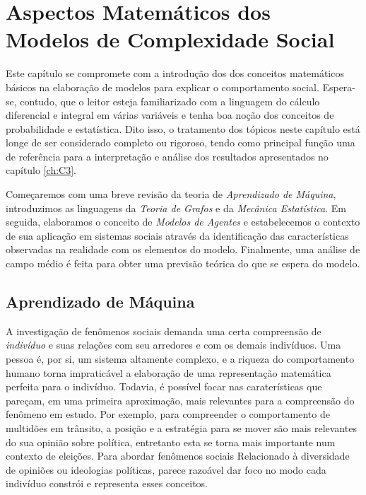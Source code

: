 

\chapter{Aspectos Matemáticos dos\\Modelos de Complexidade Social}
\label{ch:C2}

Este capítulo se compromete com a introdução dos dos conceitos
matemáticos básicos na elaboração de modelos para explicar o
comportamento social.  Espera-se, contudo, que o leitor esteja
familiarizado com a linguagem do cálculo diferencial e integral em
várias variáveis e tenha boa noção dos conceitos de probabilidade e
estatística.  Dito isso, o tratamento dos tópicos neste capítulo está
longe de ser considerado completo ou rigoroso, tendo como principal
função uma de referência para a interpretação e análise dos resultados
apresentados no capítulo \ref{ch:C3}.

Começaremos com uma breve revisão da teoria de \emph{Aprendizado de Máquina},
introduzimos as linguagens da \emph{Teoria de Grafos} e da \emph{Mecânica
Estatística}.  Em seguida, elaboramos o conceito de \emph{Modelos de Agentes}
e estabelecemos o contexto de sua aplicação em sistemas sociais através da
identificação das características observadas na realidade com os elementos do
modelo.  Finalmente, uma análise de campo médio é feita para obter uma previsão
teórica do que se espera do modelo.

\section{Aprendizado de Máquina}
\label{sec:ML}

A investigação de fenômenos sociais demanda uma certa compreensão de
\emph{indivíduo} e suas relações com seu arredores e com os demais
indivíduos.  Uma pessoa é, por si, um sistema altamente complexo, e a
riqueza do comportamento humano torna impraticável a elaboração de uma
representação matemática perfeita para o indivíduo.  Todavia, é
possível focar nas caraterísticas que pareçam, em uma primeira
aproximação, mais relevantes para a compreensão do fenômeno em estudo.
Por exemplo, para compreender o comportamento de multidões em
trânsito, a posição e a estratégia para se mover são mais relevantes
do sua opinião sobre política, entretanto esta se torna mais
importante num contexto de eleições.  Para abordar fenômenos sociais
Relacionado à diversidade de opiniões ou ideologias políticas, parece
razoável dar foco no modo cada indivíduo constrói e representa esses
conceitos.

